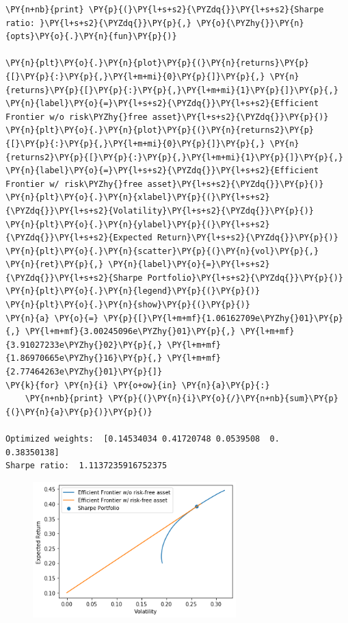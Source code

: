 \begin{tcolorbox}[breakable, size=fbox, boxrule=1pt, pad at break*=1mm,colback=cellbackground, colframe=cellborder]
\begin{Verbatim}[commandchars=\\\{\}]
\PY{n+nb}{print} \PY{p}{(}\PY{l+s+s2}{\PYZdq{}}\PY{l+s+s2}{Sharpe ratio: }\PY{l+s+s2}{\PYZdq{}}\PY{p}{,} \PY{o}{\PYZhy{}}\PY{n}{opts}\PY{o}{.}\PY{n}{fun}\PY{p}{)}

\PY{n}{plt}\PY{o}{.}\PY{n}{plot}\PY{p}{(}\PY{n}{returns}\PY{p}{[}\PY{p}{:}\PY{p}{,}\PY{l+m+mi}{0}\PY{p}{]}\PY{p}{,} \PY{n}{returns}\PY{p}{[}\PY{p}{:}\PY{p}{,}\PY{l+m+mi}{1}\PY{p}{]}\PY{p}{,} \PY{n}{label}\PY{o}{=}\PY{l+s+s2}{\PYZdq{}}\PY{l+s+s2}{Efficient Frontier w/o risk\PYZhy{}free asset}\PY{l+s+s2}{\PYZdq{}}\PY{p}{)}
\PY{n}{plt}\PY{o}{.}\PY{n}{plot}\PY{p}{(}\PY{n}{returns2}\PY{p}{[}\PY{p}{:}\PY{p}{,}\PY{l+m+mi}{0}\PY{p}{]}\PY{p}{,} \PY{n}{returns2}\PY{p}{[}\PY{p}{:}\PY{p}{,}\PY{l+m+mi}{1}\PY{p}{]}\PY{p}{,} \PY{n}{label}\PY{o}{=}\PY{l+s+s2}{\PYZdq{}}\PY{l+s+s2}{Efficient Frontier w/ risk\PYZhy{}free asset}\PY{l+s+s2}{\PYZdq{}}\PY{p}{)}
\PY{n}{plt}\PY{o}{.}\PY{n}{xlabel}\PY{p}{(}\PY{l+s+s2}{\PYZdq{}}\PY{l+s+s2}{Volatility}\PY{l+s+s2}{\PYZdq{}}\PY{p}{)}
\PY{n}{plt}\PY{o}{.}\PY{n}{ylabel}\PY{p}{(}\PY{l+s+s2}{\PYZdq{}}\PY{l+s+s2}{Expected Return}\PY{l+s+s2}{\PYZdq{}}\PY{p}{)}
\PY{n}{plt}\PY{o}{.}\PY{n}{scatter}\PY{p}{(}\PY{n}{vol}\PY{p}{,} \PY{n}{ret}\PY{p}{,} \PY{n}{label}\PY{o}{=}\PY{l+s+s2}{\PYZdq{}}\PY{l+s+s2}{Sharpe Portfolio}\PY{l+s+s2}{\PYZdq{}}\PY{p}{)}
\PY{n}{plt}\PY{o}{.}\PY{n}{legend}\PY{p}{(}\PY{p}{)}
\PY{n}{plt}\PY{o}{.}\PY{n}{show}\PY{p}{(}\PY{p}{)}
\PY{n}{a} \PY{o}{=} \PY{p}{[}\PY{l+m+mf}{1.06162709e\PYZhy{}01}\PY{p}{,} \PY{l+m+mf}{3.00245096e\PYZhy{}01}\PY{p}{,} \PY{l+m+mf}{3.91027233e\PYZhy{}02}\PY{p}{,} \PY{l+m+mf}{1.86970665e\PYZhy{}16}\PY{p}{,} \PY{l+m+mf}{2.77464263e\PYZhy{}01}\PY{p}{]}
\PY{k}{for} \PY{n}{i} \PY{o+ow}{in} \PY{n}{a}\PY{p}{:}
    \PY{n+nb}{print} \PY{p}{(}\PY{n}{i}\PY{o}{/}\PY{n+nb}{sum}\PY{p}{(}\PY{n}{a}\PY{p}{)}\PY{p}{)}

Optimized weights:  [0.14534034 0.41720748 0.0539508  0.         0.38350138]
Sharpe ratio:  1.1137235916752375
    \end{Verbatim}
\end{tcolorbox}

    \begin{figure}
    \centering
    \includegraphics[width=0.7\textwidth]{figures/markowitz_16_1.png}
    \end{figure}
    
